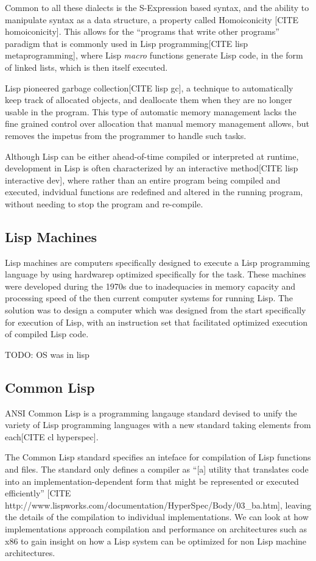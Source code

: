 \documentclass[11pt]{report}
\begin{document}
Common to all these dialects is the S-Expression based syntax, and the ability to manipulate syntax as a data structure, a property called Homoiconicity [CITE homoiconicity]. This allows for the ``programs that write other programs'' paradigm that is commonly used in Lisp programming[CITE lisp metaprogramming], where Lisp \textit{macro} functions generate Lisp code, in the form of linked lists, which is then itself executed.

Lisp pioneered garbage collection[CITE lisp gc], a technique to automatically keep track of allocated objects, and deallocate them when they are no longer usable in the program. This type of automatic memory management lacks the fine grained control over allocation that manual memory management allows, but removes the impetus from the programmer to handle such tasks.

Although Lisp can be either ahead-of-time compiled or interpreted at runtime, development in Lisp is often characterized by an interactive method[CITE lisp interactive dev], where rather than an entire program being compiled and executed, indvidual functions are redefined and altered in the running program, without needing to stop the program and re-compile.

\subsection{Lisp Machines}
Lisp machines are computers specifically designed to execute a Lisp programming language by using hardwarep optimized specifically for the task. These machines were developed during the 1970s due to inadequacies in memory capacity and processing speed of the then current computer systems for running Lisp\cite{knight-lisp}. The solution was to design a computer which was designed from the start specifically for execution of Lisp, with an instruction set that facilitated optimized execution of compiled Lisp code. 

TODO: OS was in lisp


\subsection{Common Lisp}
ANSI Common Lisp is a programming langauge standard devised to unify the variety of Lisp programming languages with a new standard taking elements from each[CITE cl hyperspec]. 

The Common Lisp standard specifies an inteface for compilation of Lisp functions and files. The standard only defines a compiler as ``[a] utility that translates code into an implementation-dependent form that might be represented or executed efficiently'' [CITE http://www.lispworks.com/documentation/HyperSpec/Body/03_ba.htm], leaving the details of the compilation to individual implementations. We can look at how implementations approach compilation and performance on architectures such as x86 to gain insight on how a Lisp system can be optimized for non Lisp machine architectures.
\end{document}
